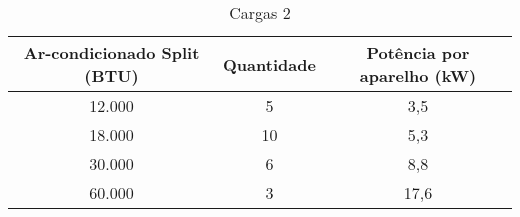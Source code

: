 \begin{table}[H]
\centering
\caption{Cargas 2}
\label{table:2}
\begin{tabular}{|c|c|c|}
\hline
Ar-condicionado Split (BTU) & Quantidade & Potência por aparelho (kW) \\ \hline
12.000                      & 5          & 3,5                        \\ \hline
18.000                      & 10         & 5,3                        \\ \hline
30.000                      & 6          & 8,8                        \\ \hline
60.000                      & 3          & 17,6                       \\ \hline
\end{tabular}
\end{table}